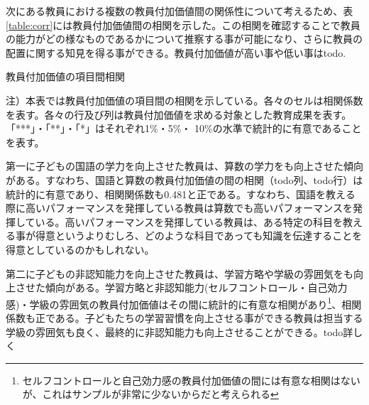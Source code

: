 \documentclass[a4paper,12pt]{article}
\begin{document}
次にある教員における複数の教員付加価値間の関係性について考えるため、表\ref{table:corr}には教員付加価値間の相関を示した。この相関を確認することで教員の能力がどの様なものであるかについて推察する事が可能になり、さらに教員の配置に関する知見を得る事ができる。教員付加価値が高い事や低い事はtodo.


\begin{table}[htbp]
\begin{adjustbox}{max width=1\textwidth}

\end{adjustbox}
\caption{教員付加価値の項目間相関}
\label{table:corr}
\begin{flushleft}
\footnotesize{
注）本表では教員付加価値の項目間の相関を示している。各々のセルは相関係数を表す。各々の行及び列は教員付加価値を求める対象とした教育成果を表す。「***」・「**」・「*」はそれぞれ1\%・5\%・ 10\%の水準で統計的に有意であることを表す。
}
\end{flushleft}
\end{table}

第一に子どもの国語の学力を向上させた教員は、算数の学力をも向上させた傾向がある。すなわち、国語と算数の教員付加価値の間の相関（todo列、todo行）は統計的に有意であり、相関関係数も0.481と正である。すなわち、国語を教える際に高いパフォーマンスを発揮している教員は算数でも高いパフォーマンスを発揮している。高いパフォーマンスを発揮している教員は、ある特定の科目を教える事が得意というよりむしろ、どのような科目であっても知識を伝達することを得意としているのかもしれない。


第二に子どもの非認知能力を向上させた教員は、学習方略や学級の雰囲気をも向上させた傾向がある。学習方略と非認知能力(セルフコントロール・自己効力感)・学級の雰囲気の教員付加価値はその間に統計的に有意な相関があり\footnote{セルフコントロールと自己効力感の教員付加価値の間には有意な相関はないが、これはサンプルが非常に少ないからだと考えられる}、相関係数も正である。子どもたちの学習習慣を向上させる事ができる教員は担当する学級の雰囲気も良く、最終的に非認知能力も向上させることができる。todo詳しく
\end{document}
